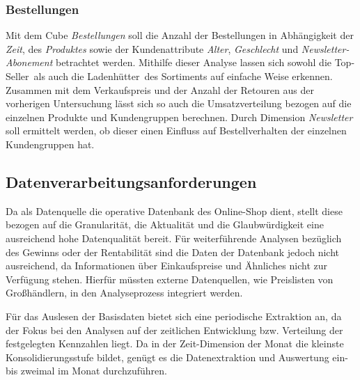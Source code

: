 \subsubsection*{Bestellungen}
\begin{figure}[htbp] 
  \centering
     
\end{figure}
\vspace{10cm}
Mit dem Cube \textit{Bestellungen} soll die Anzahl der Bestellungen in Abhängigkeit der \textit{Zeit}, des\textit{ Produktes} sowie der Kundenattribute \textit{Alter}, \textit{Geschlecht} und \textit{Newsletter-Abonement} betrachtet werden. Mithilfe dieser Analyse lassen sich sowohl die \glqq Top-Seller\grqq ~als auch die \glqq Ladenhütter\grqq ~des Sortiments auf einfache Weise erkennen. Zusammen mit dem Verkaufspreis und der Anzahl der Retouren aus der vorherigen Untersuchung lässt sich so auch die Umsatzverteilung bezogen auf die einzelnen Produkte und Kundengruppen berechnen. Durch Dimension \textit{Newsletter} soll ermittelt werden, ob dieser einen Einfluss auf Bestellverhalten der einzelnen Kundengruppen hat.


\pagebreak

\subsection{Datenverarbeitungsanforderungen}

Da als Datenquelle die operative Datenbank des Online-Shop dient, stellt diese bezogen auf die Granularität, die Aktualität und die Glaubwürdigkeit eine ausreichend hohe Datenqualität bereit.
Für weiterführende Analysen bezüglich des Gewinns oder der Rentabilität sind die Daten der Datenbank jedoch nicht ausreichend, da Informationen über Einkaufspreise und Ähnliches nicht zur Verfügung stehen. Hierfür müssten externe Datenquellen, wie Preislisten von Großhändlern, in den Analyseprozess integriert werden.

Für das Auslesen der Basisdaten bietet sich eine periodische Extraktion an, da der Fokus bei den Analysen auf der zeitlichen Entwicklung bzw. Verteilung der festgelegten Kennzahlen liegt.
Da in der Zeit-Dimension der Monat die kleinste Konsolidierungsstufe bildet, genügt es die Datenextraktion und Auswertung ein- bis zweimal im Monat durchzuführen.
